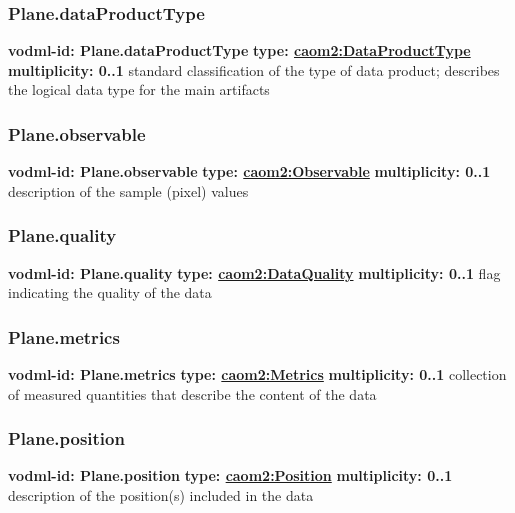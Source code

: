     \subsubsection{Plane.dataProductType}
      \textbf{vodml-id: Plane.dataProductType} \newline
      \textbf{type: \hyperref[sect:DataProductType]{caom2:DataProductType}} \newline
      \textbf{multiplicity: 0..1} \newline
      standard classification of the type of data product; describes the logical data type for the main artifacts

    \subsubsection{Plane.observable}
      \textbf{vodml-id: Plane.observable} \newline
      \textbf{type: \hyperref[sect:Observable]{caom2:Observable}} \newline
      \textbf{multiplicity: 0..1} \newline
      description of the sample (pixel) values

    \subsubsection{Plane.quality}
      \textbf{vodml-id: Plane.quality} \newline
      \textbf{type: \hyperref[sect:DataQuality]{caom2:DataQuality}} \newline
      \textbf{multiplicity: 0..1} \newline
      flag indicating the quality of the data

    \subsubsection{Plane.metrics}
      \textbf{vodml-id: Plane.metrics} \newline
      \textbf{type: \hyperref[sect:Metrics]{caom2:Metrics}} \newline
      \textbf{multiplicity: 0..1} \newline
      collection of measured quantities that describe the content of the data

    \subsubsection{Plane.position}
      \textbf{vodml-id: Plane.position} \newline
      \textbf{type: \hyperref[sect:Position]{caom2:Position}} \newline
      \textbf{multiplicity: 0..1} \newline
      description of the position(s) included in the data

